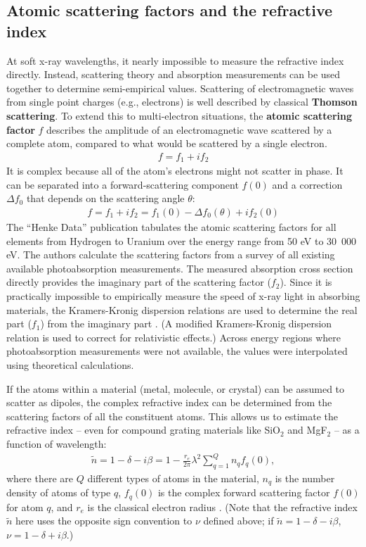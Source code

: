 \subsection{Atomic scattering factors and the refractive index}
\label{secHenke}
At soft x-ray wavelengths, it nearly impossible to measure the refractive index directly.  Instead, scattering theory and absorption measurements can be used together to determine semi-empirical values.  Scattering of electromagnetic waves from single point charges (e.g., electrons) is well described by classical \textbf{Thomson scattering}.  To extend this to multi-electron situations, the \textbf{atomic scattering factor} $f$ describes the amplitude of an electromagnetic wave scattered by a complete atom, compared to what would be scattered by a single electron.
\begin{align}
f = f_1 + i f_2
\end{align}
It is complex because all of the atom's electrons might not scatter in phase.  It can be separated into a forward-scattering component $f(0)$ and a correction $\Delta f_0$ that depends on the scattering angle $\theta$:
\begin{align}
f = f_1 + i f_2 = f_1(0) - \Delta f_0(\theta) + i f_2(0)
\end{align}
The ``Henke Data'' publication \cite{Hen93} tabulates the atomic scattering factors for all elements from Hydrogen to Uranium over the energy range from 50 eV to 30~000 eV.  The authors calculate the scattering factors from a survey of all existing available photoabsorption measurements.  The measured absorption cross section directly provides the imaginary part of the scattering factor ($f_2$).  Since it is practically impossible to empirically measure the speed of x-ray light in absorbing materials, the Kramers-Kronig dispersion relations are used to determine the real part ($f_1$) from the imaginary part \cite{Kro26}.  (A modified Kramers-Kronig dispersion relation is used to correct for relativistic effects.)  Across energy regions where photoabsorption measurements were not available, the values were interpolated using theoretical calculations.

If the atoms within a material (metal, molecule, or crystal) can be assumed to scatter as dipoles, the complex refractive index can be determined from the scattering factors of all the constituent atoms. This allows us to estimate the refractive index -- even for compound grating materials like SiO$_2$ and MgF$_2$ -- as a function of wavelength:
\begin{align}
\tilde n = 1 - \delta - i \beta = 1 - \frac{r_e}{2\pi} \lambda ^2 \sum\limits_{q=1}^Q n_q f_q(0),
\label{nFromScatteringFactor}
\end{align}
where there are $Q$ different types of atoms in the material, $n_q$ is the number density of atoms of type $q$, $f_q(0)$ is the complex forward scattering factor $f(0)$ for atom $q$, and $r_e$ is the classical electron radius \cite{Hen93}.    (Note that the refractive index $\tilde n$ here uses the opposite sign convention to $\nu$ defined above; if $\tilde n = 1 - \delta - i \beta$,  $\nu = 1 - \delta + i \beta$.)

